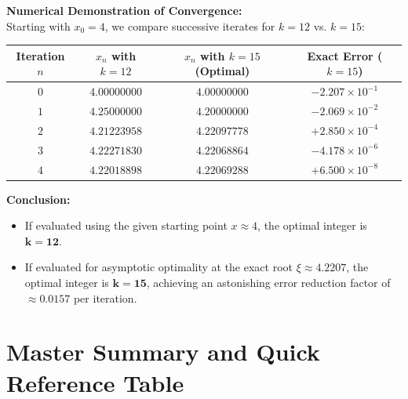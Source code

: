 \documentclass[11pt,a4paper]{article}
\numberwithin{equation}{section}
\begin{document}
\begin{solbox}
\noindent\textbf{Numerical Demonstration of Convergence:} \\
Starting with $x_0 = 4$, we compare successive iterates for $k = 12$ vs. $k = 15$:
\begin{center}
\begin{tabular}{c c c c}
\toprule
\textbf{Iteration $n$} & \textbf{$x_n$ with $k=12$} & \textbf{$x_n$ with $k=15$ (Optimal)} & \textbf{Exact Error ($k=15$)} \\
\midrule
$0$ & $4.00000000$ & $4.00000000$ & $-2.207 \times 10^{-1}$ \\
$1$ & $4.25000000$ & $4.20000000$ & $-2.069 \times 10^{-2}$ \\
$2$ & $4.21223958$ & $4.22097778$ & $+2.850 \times 10^{-4}$ \\
$3$ & $4.22271830$ & $4.22068864$ & $-4.178 \times 10^{-6}$ \\
$4$ & $4.22018898$ & $4.22069288$ & $+6.500 \times 10^{-8}$ \\
\bottomrule
\end{tabular}
\end{center}
\textbf{Conclusion:} 
\begin{itemize}[leftmargin=1.5em]
    \item If evaluated using the given starting point $x \approx 4$, the optimal integer is $\mathbf{k = 12}$.
    \item If evaluated for asymptotic optimality at the exact root $\xi \approx 4.2207$, the optimal integer is $\mathbf{k = 15}$, achieving an astonishing error reduction factor of $\approx 0.0157$ per iteration.
\end{itemize}
\end{solbox}

\section{Master Summary and Quick Reference Table}
\end{document}
